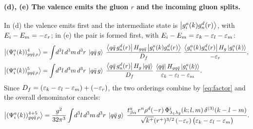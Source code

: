 \paragraph{(d), (e) The valence emits the gluon $r$ and the incoming gluon splits.}
\begin{center}
\hspace{0.7cm}
\end{center}
In (d) the valence emits first and the intermediate state is
$\left|g^{a}_{i}(k)g^{d}_{n}(r)\right\rangle$, with $E_{i}-E_{m}=-\varepsilon_{r}$; in (e) the pair is formed first, with
$E_{i}-E_{m}=\varepsilon_{k}-\varepsilon_{l}-\varepsilon_{m}$:
\begin{align}
\left|(\Psi^{a}_{i}(k))^{4}_{gq\bar q\,\rho}\right\rangle&=\int\!d^{3}l\,d^{3}m\,d^{3}r\;\left|q\bar q\,g\right\rangle\;
\frac{\left\langle q\bar q\,g^{d}_{n}(r)\right|H_{gq\bar q}\left|g^{a}_{i}(k)g^{d}_{n}(r)\right\rangle}{D_{f}}\;
\frac{\left\langle g^{a}_{i}(k)g^{d}_{n}(r)\right|H_{g}\left|g^{a}_{i}(k)\right\rangle}{-\varepsilon_{r}},
\\
\left|(\Psi^{a}_{i}(k))^{5}_{gq\bar q\,\rho}\right\rangle&=\int\!d^{3}l\,d^{3}m\,d^{3}r\;\left|q\bar q\,g\right\rangle\;
\frac{\left\langle q\bar q\,g^{d}_{n}(r)\right|H_{g}\left|q\bar q\right\rangle}{D_{f}}\;
\frac{\left\langle q\bar q\right|H_{gq\bar q}\left|g^{a}_{i}(k)\right\rangle}{\varepsilon_{k}-\varepsilon_{l}-\varepsilon_{m}} .
\end{align}
Since $D_{f}=(\varepsilon_{k}-\varepsilon_{l}-\varepsilon_{m})+(-\varepsilon_{r})$, the two orderings combine by
\eqref{eq:factor} and the overall denominator cancels:
\begin{equation}
\left|(\Psi^{a}_{i}(k))^{4+5}_{gq\bar q\,\rho}\right\rangle=\frac{g^{2}}{32\pi^{3}}\int\!d^{3}l\,d^{3}m\,d^{3}r\;
\left|q\bar q\,g\right\rangle\;
\frac{t^{a}_{\beta\alpha}\,r^{n}\rho^{d}(-r)\,\Phi^{i}_{\lambda_{1}\lambda_{2}}(k;l,m)\,\delta^{(3)}(k-l-m)}
{\sqrt{k^{+}}(r^{+})^{3/2}\,(-\varepsilon_{r})\,\big(\varepsilon_{k}-\varepsilon_{l}-\varepsilon_{m}\big)} .
\label{eq:B3de}
\end{equation}

